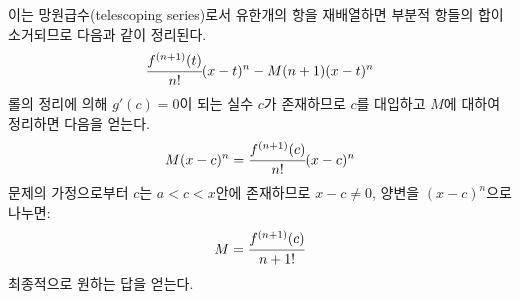 \documentclass{article}
\begin{document}
이는 망원급수(telescoping series)로서 유한개의 항을 재배열하면 부분적 항들의 합이 소거되므로 다음과 같이 정리된다.
\begin{equation}
\cfrac{f^{(n+1)}(t)}{n!}(x-t)^n-M(n+1)(x-t)^n
\end{equation}
롤의 정리에 의해 $g'(c)=0$이 되는 실수 $c$가 존재하므로 $c$를 대입하고 $M$에 대하여 정리하면 다음을 얻는다.
\begin{equation}
M(x-c)^n=\cfrac{f^{(n+1)}(c)}{n!}(x-c)^n
\end{equation}
문제의 가정으로부터 $c$는 $a<c<x$안에 존재하므로 $x-c \neq0$, 양변을 $(x-c)^n$으로 나누면:
\begin{equation}
M=\cfrac{f^{(n+1)}(c)}{n+1!}
\end{equation}
최종적으로 원하는 답을 얻는다.
\end{document}
